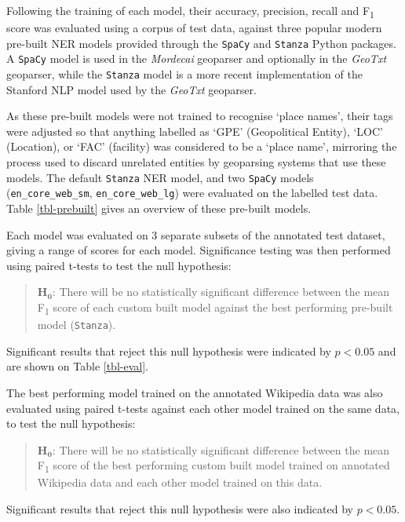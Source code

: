 \documentclass[
  letterpaper,
  11pt,
  english,
  onehalfspacing,
  headsepline]{MastersDoctoralThesis}
\begin{document}
Following the training of each model, their accuracy, precision, recall
and F\textsubscript{1} score was evaluated using a corpus of test data,
against three popular modern pre-built NER models provided through the
\texttt{SpaCy} and \texttt{Stanza} Python packages. A \texttt{SpaCy}
model is used in the \emph{Mordecai} geoparser and optionally in the
\emph{GeoTxt} geoparser, while the \texttt{Stanza} model is a more
recent implementation of the Stanford NLP model used by the
\emph{GeoTxt} geoparser.

As these pre-built models were not trained to recognise `place names',
their tags were adjusted so that anything labelled as `GPE'
(Geopolitical Entity), `LOC' (Location), or `FAC' (facility) was
considered to be a `place name', mirroring the process used to discard
unrelated entities by geoparsing systems that use these models. The
default \texttt{Stanza} NER model, and two \texttt{SpaCy} models
(\texttt{en\_core\_web\_sm}, \texttt{en\_core\_web\_lg}) were evaluated
on the labelled test data. Table \ref{tbl-prebuilt} gives an overview of
these pre-built models.

Each model was evaluated on 3 separate subsets of the annotated test
dataset, giving a range of scores for each model. Significance testing
was then performed using paired t-tests to test the null hypothesis:

\begin{quote}
\(\mathbf{H_0}\): There will be no statistically significant difference
between the mean F\textsubscript{1} score of each custom built model
against the best performing pre-built model (\texttt{Stanza}).
\end{quote}

Significant results that reject this null hypothesis were indicated by
\(p<0.05\) and are shown on Table \ref{tbl-eval}.

The best performing model trained on the annotated Wikipedia data was
also evaluated using paired t-tests against each other model trained on
the same data, to test the null hypothesis:

\begin{quote}
\(\mathbf{H_0}\): There will be no statistically significant difference
between the mean F\textsubscript{1} score of the best performing custom
built model trained on annotated Wikipedia data and each other model
trained on this data.
\end{quote}

Significant results that reject this null hypothesis were also indicated
by \(p<0.05\).
\end{document}
